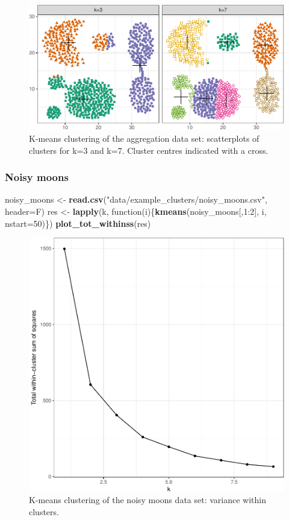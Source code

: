 \documentclass[]{book}
\newenvironment{Shaded}{\begin{snugshade}}{\end{snugshade}}
\newcommand{\KeywordTok}[1]{\textcolor[rgb]{0.13,0.29,0.53}{\textbf{{#1}}}}
\newcommand{\DataTypeTok}[1]{\textcolor[rgb]{0.13,0.29,0.53}{{#1}}}
\newcommand{\DecValTok}[1]{\textcolor[rgb]{0.00,0.00,0.81}{{#1}}}
\newcommand{\StringTok}[1]{\textcolor[rgb]{0.31,0.60,0.02}{{#1}}}
\newcommand{\NormalTok}[1]{{#1}}
\theoremstyle{definition}
\theoremstyle{definition}
\theoremstyle{definition}
\theoremstyle{remark}
\begin{document}
\begin{figure}

{\centering \includegraphics[width=1\linewidth]{09-clustering_files/figure-latex/kmeansAggregationScatter-1} 

}

\caption{K-means clustering of the aggregation data set: scatterplots of clusters for k=3 and k=7. Cluster centres indicated with a cross.}\label{fig:kmeansAggregationScatter}
\end{figure}

\subsubsection{Noisy moons}\label{noisy-moons}

\begin{Shaded}
\begin{Highlighting}[]
\NormalTok{noisy_moons <-}\StringTok{ }\KeywordTok{read.csv}\NormalTok{(}\StringTok{"data/example_clusters/noisy_moons.csv"}\NormalTok{, }\DataTypeTok{header=}\NormalTok{F)}
\NormalTok{res <-}\StringTok{ }\KeywordTok{lapply}\NormalTok{(k, function(i)\{}\KeywordTok{kmeans}\NormalTok{(noisy_moons[,}\DecValTok{1}\NormalTok{:}\DecValTok{2}\NormalTok{], i, }\DataTypeTok{nstart=}\DecValTok{50}\NormalTok{)\})}
\KeywordTok{plot_tot_withinss}\NormalTok{(res)}
\end{Highlighting}
\end{Shaded}

\begin{figure}

{\centering \includegraphics[width=0.5\linewidth]{09-clustering_files/figure-latex/kmeansNoisyMoonsElbow-1} 

}

\caption{K-means clustering of the noisy moons data set: variance within clusters.}\label{fig:kmeansNoisyMoonsElbow}
\end{figure}
\end{document}
